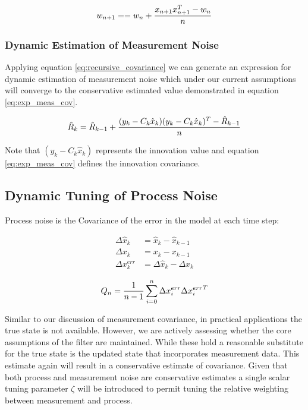 \documentclass[a4paper]{article}
\begin{document}
	\begin{equation}
		w_{n+1} = = w_n + {x_{n+1}x_{n+1}^T -w_n \over n}
		\label{eq:recursive_covariance}
	\end{equation}

	\subsubsection{Dynamic Estimation of Measurement Noise}

	Applying equation \ref{eq:recursive_covariance} we can generate an expression for dynamic estimation of measurement noise which under our current assumptions will converge to the conservative estimated value demonstrated in equation \ref{eq:exp_meas_cov}.


	\begin{equation}
		\hat{R}_k = \hat{R}_{k-1} + {(y_k - C_k \hat{x}_k)(y_k - C_k \hat{x}_k)^T - \hat{R}_{k-1} \over n}
	\end{equation}

	Note that $(y_k - C_k \hat{x}_k)$ represents the innovation value and equation \ref{eq:exp_meas_cov} defines the innovation covariance.

	\subsection{Dynamic Tuning of Process Noise}

	Process noise is the Covariance of the error in the model at each time step:

	\begin{align*}
		\Delta \hat{x}_k &= \hat{x}_k - \hat{x}_{k-1}\\
		\Delta x_k &= x_k - x_{k-1}\\
		\Delta x_k^{err} &= \Delta \hat{x}_k - \Delta x_k
	\end{align*}

	\begin{equation}
		Q_n = {1 \over n - 1} \displaystyle\sum_{i=0} ^{n} \Delta x_i^{err} {\Delta x_i^{err}}^T
	\end{equation}

	Similar to our discussion of measurement covariance, in practical applications the true state is not available. However, we are actively assessing whether the core assumptions of the filter are maintained. While these hold a reasonable substitute for the true state is the updated state that incorporates measurement data. This estimate again will result in a conservative estimate of covariance. Given that both process and measurement noise are conservative estimates a single scalar tuning parameter $\zeta$ will be introduced to permit tuning the relative weighting between measurement and process.
\end{document}
